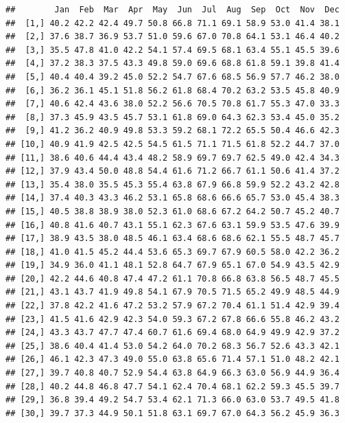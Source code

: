 \documentclass[
]{article}
\begin{document}
\begin{verbatim}
##        Jan  Feb  Mar  Apr  May  Jun  Jul  Aug  Sep  Oct  Nov  Dec
##  [1,] 40.2 42.2 42.4 49.7 50.8 66.8 71.1 69.1 58.9 53.0 41.4 38.1
##  [2,] 37.6 38.7 36.9 53.7 51.0 59.6 67.0 70.8 64.1 53.1 46.4 40.2
##  [3,] 35.5 47.8 41.0 42.2 54.1 57.4 69.5 68.1 63.4 55.1 45.5 39.6
##  [4,] 37.2 38.3 37.5 43.3 49.8 59.0 69.6 68.8 61.8 59.1 39.8 41.4
##  [5,] 40.4 40.4 39.2 45.0 52.2 54.7 67.6 68.5 56.9 57.7 46.2 38.0
##  [6,] 36.2 36.1 45.1 51.8 56.2 61.8 68.4 70.2 63.2 53.5 45.8 40.9
##  [7,] 40.6 42.4 43.6 38.0 52.2 56.6 70.5 70.8 61.7 55.3 47.0 33.3
##  [8,] 37.3 45.9 43.5 45.7 53.1 61.8 69.0 64.3 62.3 53.4 45.0 35.2
##  [9,] 41.2 36.2 40.9 49.8 53.3 59.2 68.1 72.2 65.5 50.4 46.6 42.3
## [10,] 40.9 41.9 42.5 42.5 54.5 61.5 71.1 71.5 61.8 52.2 44.7 37.0
## [11,] 38.6 40.6 44.4 43.4 48.2 58.9 69.7 69.7 62.5 49.0 42.4 34.3
## [12,] 37.9 43.4 50.0 48.8 54.4 61.6 71.2 66.7 61.1 50.6 41.4 37.2
## [13,] 35.4 38.0 35.5 45.3 55.4 63.8 67.9 66.8 59.9 52.2 43.2 42.8
## [14,] 37.4 40.3 43.3 46.2 53.1 65.8 68.6 66.6 65.7 53.0 45.4 38.3
## [15,] 40.5 38.8 38.9 38.0 52.3 61.0 68.6 67.2 64.2 50.7 45.2 40.7
## [16,] 40.8 41.6 40.7 43.1 55.1 62.3 67.6 63.1 59.9 53.5 47.6 39.9
## [17,] 38.9 43.5 38.0 48.5 46.1 63.4 68.6 68.6 62.1 55.5 48.7 45.7
## [18,] 41.0 41.5 45.2 44.4 53.6 65.3 69.7 67.9 60.5 58.0 42.2 36.2
## [19,] 34.9 36.0 41.1 48.1 52.8 64.7 67.9 65.1 67.0 54.9 43.5 42.9
## [20,] 42.2 44.6 40.8 47.4 47.2 61.1 70.8 66.8 63.8 56.5 48.7 45.5
## [21,] 43.1 43.7 41.9 49.8 54.1 67.9 70.5 71.5 65.2 49.9 48.5 44.9
## [22,] 37.8 42.2 41.6 47.2 53.2 57.9 67.2 70.4 61.1 51.4 42.9 39.4
## [23,] 41.5 41.6 42.9 42.3 54.0 59.3 67.2 67.8 66.6 55.8 46.2 43.2
## [24,] 43.3 43.7 47.7 47.4 60.7 61.6 69.4 68.0 64.9 49.9 42.9 37.2
## [25,] 38.6 40.4 41.4 53.0 54.2 64.0 70.2 68.3 56.7 52.6 43.3 42.1
## [26,] 46.1 42.3 47.3 49.0 55.0 63.8 65.6 71.4 57.1 51.0 48.2 42.1
## [27,] 39.7 40.8 40.7 52.9 54.4 63.8 64.9 66.3 63.0 56.9 44.9 36.4
## [28,] 40.2 44.8 46.8 47.7 54.1 62.4 70.4 68.1 62.2 59.3 45.5 39.7
## [29,] 36.8 39.4 49.2 54.7 53.4 62.1 71.3 66.0 63.0 53.7 49.5 41.8
## [30,] 39.7 37.3 44.9 50.1 51.8 63.1 69.7 67.0 64.3 56.2 45.9 36.3
\end{verbatim}
\newpage
\end{document}
